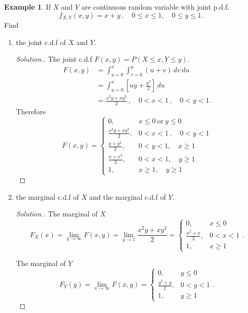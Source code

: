 \documentclass[12pt,a4paper]{report}
\theoremstyle{definition}
\newtheorem{example}[thm]{Example}
\theoremstyle{plain}
\theoremstyle{definition}
\begin{document}
\begin{example}
If $X$ and $Y$ are continuous random variable with joint p.d.f. \[f_{X,Y}(x,y) = x + y\, , \quad 0\leq x \leq 1, \quad 0 \leq y \leq 1.\]
Find
\begin{enumerate}
\item[(i).] the joint c.d.f of $X$ and $Y$.
\begin{proof}[\textit{Solution.}]
The joint c.d.f $F(x,y) = P(X\leq x, Y\leq y)$.
\begin{align*}
F(x,y) & = \int_{u= 0}^x\int_{v = 0}^y (u + v)\, dv \, du\\
& = \int^x_{u = 0}\left[uy + \frac{y^2}{2}\right]\, du\\
& = \frac{x^2y + xy^2}{2}\,, \quad 0 < x < 1\, , \quad 0 < y < 1.
\end{align*}
Therefore
\[F(x,y) = \begin{cases}
0, & x\leq 0\ \text{or}\ y\leq 0\\
\frac{x^2y+xy^2}{2}, & 0< x < 1\, , \quad 0 < y < 1\\
\frac{y + y^2}{2}, & 0< y < 1, \quad x\geq 1\\
\frac{x + x^2}{2}, & 0 < x < 1, \quad y \geq 1\\
1, & x\geq 1, \quad y \geq 1
\end{cases}\]
\end{proof}



\item[(ii).] the marginal c.d.f of $X$ and the marginal c.d.f of $Y$.
\begin{proof}[\textit{Solution.}]
The marginal of $X$
\[F_X(x) = \lim_{y\rightarrow \infty}F(x,y) = \lim_{y \rightarrow 1} \frac{x^2y+xy^2}{2} = \begin{cases}
0, & x \leq 0\\
\frac{x^2 + x}{2}, &  0 < x < 1\\
1, & x\geq 1
\end{cases}.\]

The marginal of $Y$
\[F_Y(y)  = \lim_{x\rightarrow \infty} F(x,y) = \begin{cases}
0, & y \leq 0\\
\frac{y^2 + y}{2}, & 0 < y < 1\\
1, & y \geq 1
\end{cases}.\]
\end{proof}
\end{enumerate}
\end{example}
\end{document}
